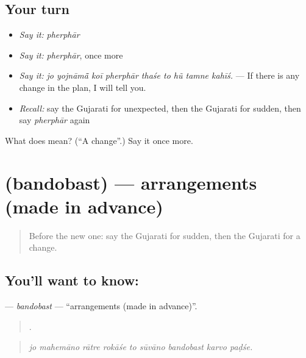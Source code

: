 \subsection*{Your turn}
\begin{itemize}
\raggedright
  \item \emph{Say it:} \emph{pherphār}
  \item \emph{Say it:} \emph{pherphār}, once more
  \item \emph{Say it:} \emph{jo yojnāmā̃ koī pherphār thaśe to hũ tamne kahīś.} — If there is any change in the plan, I will tell you.
  \item \emph{Recall:} say the Gujarati for unexpected, then the Gujarati for sudden, then say \emph{pherphār} again
\end{itemize}

\begin{tcolorbox}[breakable,colback=teal!4,colframe=teal!35!black,title={Before you move on}]
What does  mean? (\textquotedblleft{}A change\textquotedblright{}.) Say it once more.
\end{tcolorbox}
\section[\texorpdfstring{\gu{બંદોબસ્ત} (bandobast)}{બંદોબસ્ત (bandobast)}]{ (bandobast) — arrangements (made in advance)}

\label{lesson:GU-C531-bandobast}



\begin{quote}
Before the new one: say the Gujarati for sudden, then the Gujarati for a change.
\end{quote}

\subsection*{You'll want to know: }
\textbf{} — \emph{bandobast} — \textquotedblleft{}arrangements (made in advance)\textquotedblright{}.

\begin{quote}
        .
\end{quote}

\begin{quote}
\emph{jo mahemāno rātre rokāśe to sūvāno bandobast karvo paḍśe.}
\end{quote}

